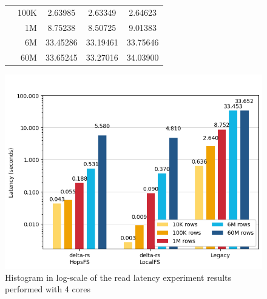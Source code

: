 \begin{figure}
\begin{minipage}[b]{\textwidth}
\begin{tabular}{c r S[table-format=5.5] S[table-format=5.5] S[table-format=5.5]}
                                      & 100K &     2.63985 &    2.63349 &    2.64623\\ 
                                      & 1M   &     8.75238 &    8.50725 &    9.01383\\
                                      & 6M   &    33.45286 &   33.19461 &   33.75646\\
                                      & 60M  &    33.65245 &   33.27016 &   34.03900\\
            \bottomrule
        \end{tabular}
    \end{minipage}
    \begin{minipage}[b]{\textwidth}
        \centering
        \includegraphics[width=\textwidth]{figures/99-appendix/results-diagrams/read/read_time_4_core.png}
        \caption{Histogram in log-scale of the read latency experiment results performed with 4  cores}
        \label{fig:appx_res_read_time_4_cores}
    \end{minipage}
\end{figure}

